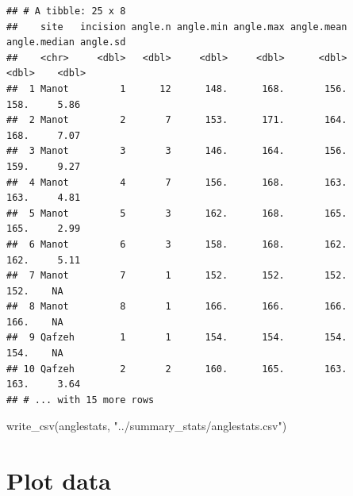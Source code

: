 \documentclass[
]{article}
\newenvironment{Shaded}{\begin{snugshade}}{\end{snugshade}}
\newcommand{\FunctionTok}[1]{\textcolor[rgb]{0.00,0.00,0.00}{#1}}
\newcommand{\NormalTok}[1]{#1}
\newcommand{\StringTok}[1]{\textcolor[rgb]{0.31,0.60,0.02}{#1}}
\begin{document}
\begin{verbatim}
## # A tibble: 25 x 8
##    site   incision angle.n angle.min angle.max angle.mean angle.median angle.sd
##    <chr>     <dbl>   <dbl>     <dbl>     <dbl>      <dbl>        <dbl>    <dbl>
##  1 Manot         1      12      148.      168.       156.         158.     5.86
##  2 Manot         2       7      153.      171.       164.         168.     7.07
##  3 Manot         3       3      146.      164.       156.         159.     9.27
##  4 Manot         4       7      156.      168.       163.         163.     4.81
##  5 Manot         5       3      162.      168.       165.         165.     2.99
##  6 Manot         6       3      158.      168.       162.         162.     5.11
##  7 Manot         7       1      152.      152.       152.         152.    NA   
##  8 Manot         8       1      166.      166.       166.         166.    NA   
##  9 Qafzeh        1       1      154.      154.       154.         154.    NA   
## 10 Qafzeh        2       2      160.      165.       163.         163.     3.64
## # ... with 15 more rows
\end{verbatim}

\begin{Shaded}
\begin{Highlighting}[]
\FunctionTok{write\_csv}\NormalTok{(anglestats, }\StringTok{"../summary\_stats/anglestats.csv"}\NormalTok{)}
\end{Highlighting}
\end{Shaded}

\hypertarget{plot-data}{%
\section{Plot data}\label{plot-data}}
\end{document}
